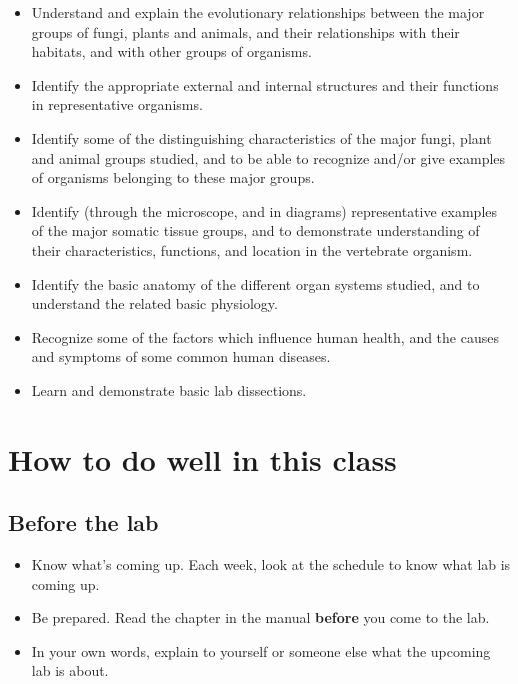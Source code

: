 \documentclass[]{book}
\providecommand{\tightlist}{%
  \setlength{\itemsep}{0pt}\setlength{\parskip}{0pt}}
\theoremstyle{definition}
\theoremstyle{definition}
\theoremstyle{definition}
\theoremstyle{remark}
\begin{document}
\begin{itemize}
\item
  Understand and explain the evolutionary relationships between the
  major groups of fungi, plants and animals, and their relationships
  with their habitats, and with other groups of organisms.
\item
  Identify the appropriate external and internal structures and their
  functions in representative organisms.
\item
  Identify some of the distinguishing characteristics of the major
  fungi, plant and animal groups studied, and to be able to recognize
  and/or give examples of organisms belonging to these major groups.
\item
  Identify (through the microscope, and in diagrams) representative
  examples of the major somatic tissue groups, and to demonstrate
  understanding of their characteristics, functions, and location in the
  vertebrate organism.
\item
  Identify the basic anatomy of the different organ systems studied, and
  to understand the related basic physiology.
\item
  Recognize some of the factors which influence human health, and the
  causes and symptoms of some common human diseases.
\item
  Learn and demonstrate basic lab dissections.
\end{itemize}

\chapter{How to do well in this
class}\label{how-to-do-well-in-this-class}

\section*{Before the lab}\label{before-the-lab}

\begin{itemize}
\tightlist
\item
  Know what's coming up. Each week, look at the schedule to know what
  lab is coming up.
\item
  Be prepared. Read the chapter in the manual \textbf{before} you come
  to the lab.
\item
  In your own words, explain to yourself or someone else what the
  upcoming lab is about.
\end{itemize}
\end{document}
